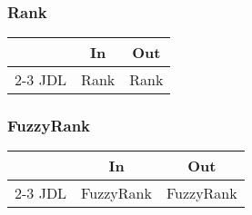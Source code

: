 \documentclass{article}
\newenvironment{inouttabular}%
{\begin{center}\begin{tabular}{l>{\ttfamily\footnotesize}c>{\ttfamily\footnotesize}c}%
\toprule
& \textnormal{\normalsize{In}} & \textnormal{\normalsize{Out}}\\ \cmidrule{2-3}}
{\bottomrule\end{tabular}\end{center}}
\begin{document}
\subsubsection{Rank}
\begin{inouttabular}
JDL & Rank & Rank\\
\end{inouttabular}

\subsubsection{FuzzyRank}
\begin{inouttabular}
JDL & FuzzyRank & FuzzyRank\\
\end{inouttabular}
\end{document}
